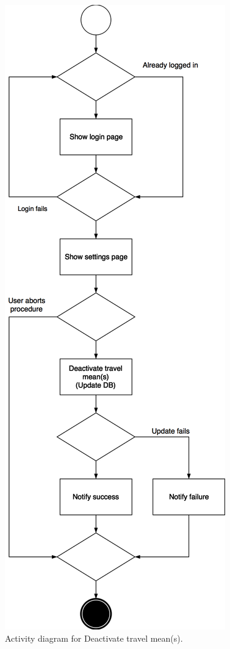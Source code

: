 \documentclass{article}
\begin{document}
	\begin{figure}[h!]
		\bigskip
		\centering
		\includegraphics[scale=0.25]{img/diagrams/deactivate_travel_mean_ad.png}
		\caption{Activity diagram for Deactivate travel mean(s).}
	\end{figure}
	\newpage
	
\end{document}
